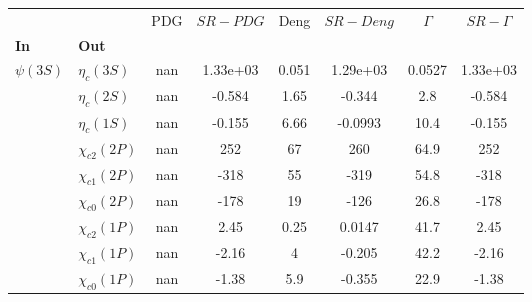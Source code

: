 \begin{tabular}{l|l|c|c|c|c|c|c}
\toprule
           &                 &  PDG &  $SR-PDG$ &  Deng &  $SR-Deng$ &  $\Gamma$ &  $SR-\Gamma$ \\
\textbf{In} & \textbf{Out} &      &           &       &            &           &              \\
\midrule
\textbf{$\psi(3S)$} & \textbf{$\eta_{c}(3S)$} &  nan &  1.33e+03 & 0.051 &   1.29e+03 &    0.0527 &     1.33e+03 \\
           & \textbf{$\eta_{c}(2S)$} &  nan &    -0.584 &  1.65 &     -0.344 &       2.8 &       -0.584 \\
           & \textbf{$\eta_{c}(1S)$} &  nan &    -0.155 &  6.66 &    -0.0993 &      10.4 &       -0.155 \\
           & \textbf{$\chi_{c2}(2P)$} &  nan &       252 &    67 &        260 &      64.9 &          252 \\
           & \textbf{$\chi_{c1}(2P)$} &  nan &      -318 &    55 &       -319 &      54.8 &         -318 \\
           & \textbf{$\chi_{c0}(2P)$} &  nan &      -178 &    19 &       -126 &      26.8 &         -178 \\
           & \textbf{$\chi_{c2}(1P)$} &  nan &      2.45 &  0.25 &     0.0147 &      41.7 &         2.45 \\
           & \textbf{$\chi_{c1}(1P)$} &  nan &     -2.16 &     4 &     -0.205 &      42.2 &        -2.16 \\
           & \textbf{$\chi_{c0}(1P)$} &  nan &     -1.38 &   5.9 &     -0.355 &      22.9 &        -1.38 \\
\bottomrule
\end{tabular}
